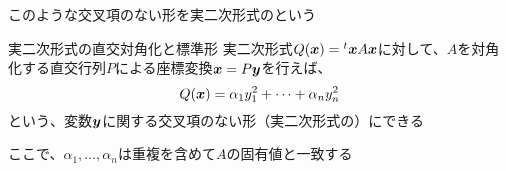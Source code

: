 \documentclass[../../../topic_linear-algebra]{subfiles}
\begin{document}
\br

このような交叉項のない形を実二次形式のという

\begin{theorem*}{実二次形式の直交対角化と標準形}
  実二次形式$Q(\vb*{x}) = {}^t \vb*{x} A \vb*{x}$に対して、$A$を対角化する直交行列$P$による座標変換$\vb*{x} = P\vb*{y}$を行えば、
  \begin{equation*}
    Q(\vb*{x}) = \alpha_1 y_1^2 + \cdots + \alpha_n y_n^2
  \end{equation*}
  という、変数$\vb*{y}$に関する交叉項のない形（実二次形式の）にできる

  ここで、$\alpha_1, \ldots, \alpha_n$は重複を含めて$A$の固有値と一致する
\end{theorem*}
\end{document}
